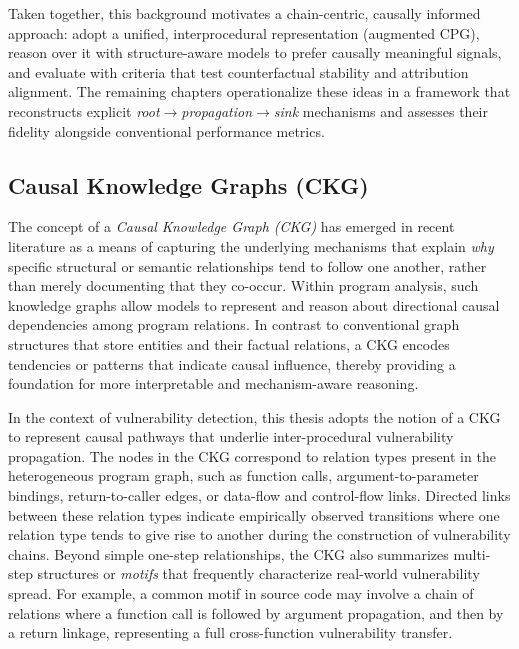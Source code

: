\documentclass{buthesis}
\begin{document}
Taken together, this background motivates a chain-centric, causally informed approach: adopt a unified, interprocedural representation (augmented CPG), reason over it with structure-aware models to prefer causally meaningful signals, and evaluate with criteria that test counterfactual stability and attribution alignment. The remaining chapters operationalize these ideas in a framework that reconstructs explicit \emph{root$\rightarrow$propagation$\rightarrow$sink} mechanisms and assesses their fidelity alongside conventional performance metrics.



\subsection{Causal Knowledge Graphs (CKG)}
\label{sec:theory-ckg}

The concept of a \emph{Causal Knowledge Graph (CKG)} has emerged in recent literature as a means of capturing the underlying mechanisms that explain \emph{why} specific structural or semantic relationships tend to follow one another, rather than merely documenting that they co-occur. Within program analysis, such knowledge graphs allow models to represent and reason about directional causal dependencies among program relations. In contrast to conventional graph structures that store entities and their factual relations, a CKG encodes tendencies or patterns that indicate causal influence, thereby providing a foundation for more interpretable and mechanism-aware reasoning. 

In the context of vulnerability detection, this thesis adopts the notion of a CKG to represent causal pathways that underlie inter-procedural vulnerability propagation. The nodes in the CKG correspond to relation types present in the heterogeneous program graph, such as function calls, argument-to-parameter bindings, return-to-caller edges, or data-flow and control-flow links. Directed links between these relation types indicate empirically observed transitions where one relation type tends to give rise to another during the construction of vulnerability chains. Beyond simple one-step relationships, the CKG also summarizes multi-step structures or \emph{motifs} that frequently characterize real-world vulnerability spread. For example, a common motif in source code may involve a chain of relations where a function call is followed by argument propagation, and then by a return linkage, representing a full cross-function vulnerability transfer.
\end{document}
